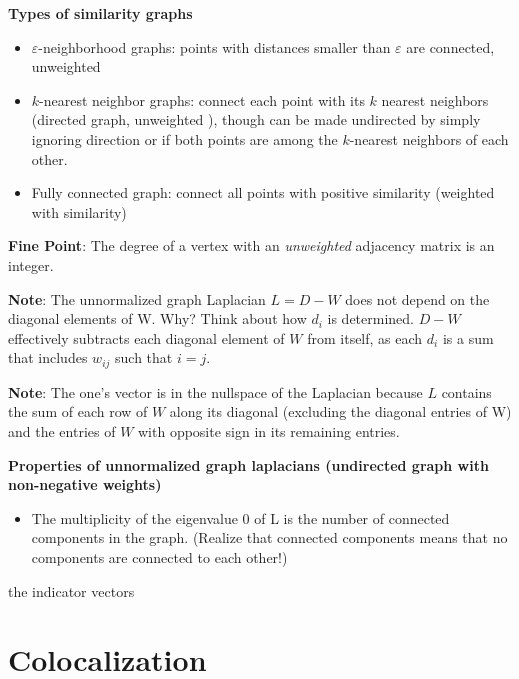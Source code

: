 \documentclass{article}
\begin{document}
        \textbf{Types of similarity graphs}
        \begin{itemize}
        \item\ensuremath{\varepsilon}-neighborhood graphs: points with distances
smaller than \ensuremath{\varepsilon} are connected, unweighted
        \item\ensuremath{k}-nearest neighbor graphs: connect each point with its
\ensuremath{k} nearest neighbors (directed graph, unweighted ), though can be
made undirected by simply ignoring direction or if both points are among the
\ensuremath{k}-nearest neighbors of each other.
        \item Fully connected graph: connect all points with positive
similarity (weighted with similarity)
        \end{itemize}
        
        \textbf{Fine Point}: The degree of a vertex with an \emph{unweighted}
adjacency matrix is an integer. 

        \textbf{Note}: The unnormalized graph Laplacian
\ensuremath{L = D - W} does not depend on the diagonal elements of W. Why? Think
about how \ensuremath{d_{i}} is determined. \ensuremath{D - W} effectively
subtracts each diagonal element of \ensuremath{W} from itself, as each
\ensuremath{d_{i}} is a sum that includes \ensuremath{w_{ij}} such that
\ensuremath{i=j}.  
        
        \textbf{Note}: The one's vector is in the nullspace of the Laplacian
because \ensuremath{L} contains the sum of each row of \ensuremath{W} along its
diagonal (excluding the diagonal entries of W) and the entries of \ensuremath{W}
with opposite sign in its remaining entries.

        \textbf{Properties of unnormalized graph laplacians (undirected graph
with non-negative weights)}
        \begin{itemize}
           \item The multiplicity of the eigenvalue 0 of L is the number of
connected components in the graph. (Realize that connected components means that
no components are connected to each other!)
        \end{itemize}
the indicator vectors        
        
\section{Colocalization} 
\end{document}
